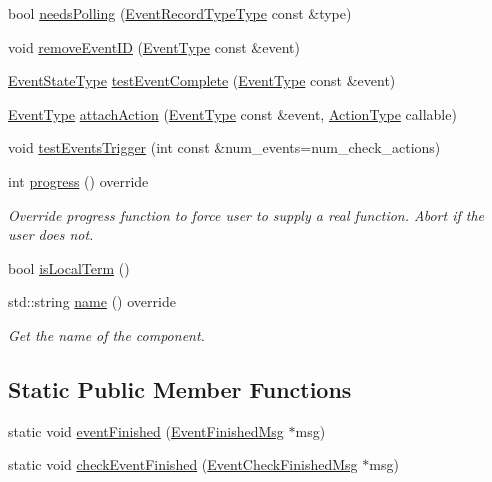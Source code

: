 \begin{DoxyCompactItemize}
bool \hyperlink{structvt_1_1event_1_1_async_event_a4d6056e47909a858fcd3bfc3782b8d2d}{needs\+Polling} (\hyperlink{namespacevt_1_1event_a1ea9fec44d101bf40b8fd786d44ebed9}{Event\+Record\+Type\+Type} const \&type)
\item 
void \hyperlink{structvt_1_1event_1_1_async_event_a67a603eff81f5f912118f38fd5cbaccb}{remove\+Event\+ID} (\hyperlink{namespacevt_a009267401def7ae8bf201892222d060f}{Event\+Type} const \&event)
\item 
\hyperlink{namespacevt_1_1event_a787aca6361696d96d817a639195c429c}{Event\+State\+Type} \hyperlink{structvt_1_1event_1_1_async_event_ac14b4e2fc658f70937c591dfdc8ea083}{test\+Event\+Complete} (\hyperlink{namespacevt_a009267401def7ae8bf201892222d060f}{Event\+Type} const \&event)
\item 
\hyperlink{namespacevt_a009267401def7ae8bf201892222d060f}{Event\+Type} \hyperlink{structvt_1_1event_1_1_async_event_aa6432e2fff56eb073f9489bfc37e89bc}{attach\+Action} (\hyperlink{namespacevt_a009267401def7ae8bf201892222d060f}{Event\+Type} const \&event, \hyperlink{namespacevt_ae0a5a7b18cc99d7b732cb4d44f46b0f3}{Action\+Type} callable)
\item 
void \hyperlink{structvt_1_1event_1_1_async_event_a383418f69041085a8c76b87c3bf82f27}{test\+Events\+Trigger} (int const \&num\+\_\+events=num\+\_\+check\+\_\+actions)
\item 
int \hyperlink{structvt_1_1event_1_1_async_event_a36f18429bc2856a30c8f7fd70654e0a4}{progress} () override
\begin{DoxyCompactList}\small\item\em Override progress function to force user to supply a real function. Abort if the user does not. \end{DoxyCompactList}\item 
bool \hyperlink{structvt_1_1event_1_1_async_event_a10af2d5cb5318e2ef25eabcd88c8139a}{is\+Local\+Term} ()
\item 
std\+::string \hyperlink{structvt_1_1event_1_1_async_event_ac68b97804ca9b3dab1785a3c8a5d8242}{name} () override
\begin{DoxyCompactList}\small\item\em Get the name of the component. \end{DoxyCompactList}\end{DoxyCompactItemize}
\subsection*{Static Public Member Functions}
\begin{DoxyCompactItemize}
\item 
static void \hyperlink{structvt_1_1event_1_1_async_event_a2228d79f1c1f838e630dcb3325edfde3}{event\+Finished} (\hyperlink{structvt_1_1_event_finished_msg}{Event\+Finished\+Msg} $\ast$msg)
\item 
static void \hyperlink{structvt_1_1event_1_1_async_event_a5493f4402db0fffba5300246247523b9}{check\+Event\+Finished} (\hyperlink{structvt_1_1_event_check_finished_msg}{Event\+Check\+Finished\+Msg} $\ast$msg)
\end{DoxyCompactItemize}
